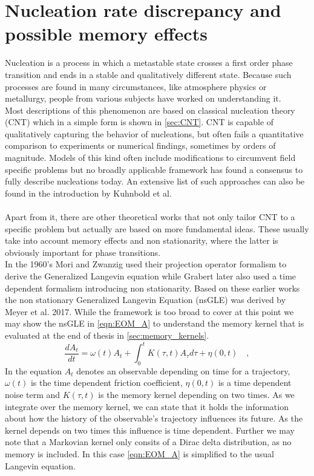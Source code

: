 \section{Nucleation rate discrepancy and possible memory effects}
\label{sec:memory_approach}
Nucleation is a process in which a metastable state crosses a first order phase transition and ends in a stable and qualitatively different state. Because such processes are found in many circumstances, like atmosphere physics or metallurgy, people from various subjects have worked on understanding it.\\

Most descriptions of this phenomenon are based on classical nucleation theory (CNT) which in a simple form is shown in \autoref{sec:CNT}. CNT is capable of qualitatively capturing the behavior of nucleations, but often fails a quantitative comparison to experiments or numerical findings, sometimes by orders of magnitude. Models of this kind often include modifications to circumvent field specific problems but no broadly applicable framework has found a consensus to fully describe nucleations today\cite{MeyerThesis}. An extensive list of such approaches can also be found in the introduction by Kuhnbold et al.\cite{Kuhnbold2019}\\

\\

Apart from it, there are other theoretical works that not only tailor CNT to a specific problem but actually are based on more fundamental ideas. These usually take into account memory effects and non stationarity, where the latter is obviously important for phase transitions.\\

In the 1960's Mori and Zwanzig used their projection operator formalism to derive the Generalized Langevin equation while Grabert later also used a time dependent formalism introducing non stationarity. Based on these earlier works the non stationary Generalized Langevin Equation (nsGLE) was derived by Meyer et al. 2017\cite{Meyer_nsGLE}. While the framework is too broad to cover at this point we may show the nsGLE in \autoref{eqn:EOM_A} to understand the memory kernel that is evaluated at the end of thesis in \autoref{sec:memory_kernels}.
\begin{equation}
\label{eqn:EOM_A}
  \frac{d A_{t}}{dt} = \omega (t) A_{t} + \int_{0}^{t} K(\tau, t) A_{\tau} d\tau + \eta(0,t) \quad ,
\end{equation}
In the equation $A_{t}$ denotes an observable depending on time for a trajectory, $\omega (t)$ is the time dependent friction coefficient, $\eta(0,t)$ is a time dependent noise term and $K(\tau, t)$ is the memory kernel depending on two times. As we integrate over the memory kernel, we can state that it holds the information about how the history of the observable's trajectory influences its future. As the kernel depends on two times this influence is time dependent. Further we may note that a Markovian kernel only consits of a Dirac delta distribution, as no memory is included. In this case \autoref{eqn:EOM_A} is simplified to the usual Langevin equation.\\

